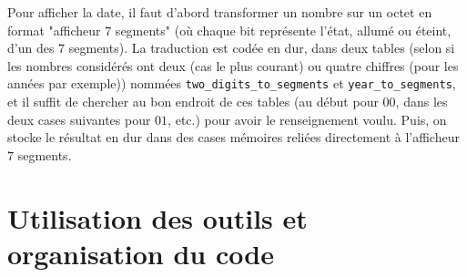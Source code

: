 \documentclass[13pt]{article}
\begin{document}
Pour afficher la date, il faut d'abord transformer un nombre sur un octet en
format "afficheur $7$ segments" (où chaque bit représente l'état, allumé ou
éteint, d'un des $7$ segments). La traduction est codée en dur, dans deux tables
(selon si les nombres considérés ont deux (cas le plus courant) ou quatre
chiffres (pour les années par exemple)) nommées \texttt{two\_digits\_to\_segments} et
\texttt{year\_to\_segments}, et il suffit de chercher au bon endroit de ces tables (au
début pour $00$, dans les deux cases suivantes pour $01$, etc.) pour avoir
le renseignement voulu. Puis, on stocke le résultat en dur dans des cases
mémoires reliées directement à l'afficheur $7$ segments.


\section{Utilisation des outils et organisation du code}
\end{document}
